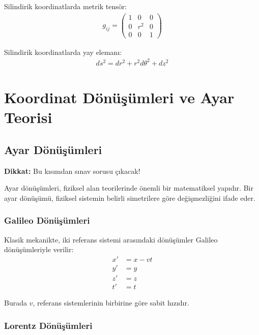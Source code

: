 \documentclass[11pt,letterpaper,twocolumn]{fenbil}
\begin{document}
Silindirik koordinatlarda metrik tensör:
\begin{align}
g_{ij} = \begin{pmatrix}
1 & 0 & 0 \\
0 & r^2 & 0 \\
0 & 0 & 1
\end{pmatrix}
\end{align}

Silindirik koordinatlarda yay elemanı:
\begin{align}
ds^2 = dr^2 + r^2d\theta^2 + dz^2
\end{align}

\maketitle

\section{Koordinat Dönüşümleri ve Ayar Teorisi}

\subsection{Ayar Dönüşümleri}

\textbf{Dikkat:} Bu kısımdan sınav sorusu çıkacak!

Ayar dönüşümleri, fiziksel alan teorilerinde önemli bir matematiksel yapıdır. Bir ayar dönüşümü, fiziksel sistemin belirli simetrilere göre değişmezliğini ifade eder. 

\subsubsection{Galileo Dönüşümleri}

Klasik mekanikte, iki referans sistemi arasındaki dönüşümler Galileo dönüşümleriyle verilir:
\begin{align}
x' &= x - vt \\
y' &= y \\
z' &= z \\
t' &= t
\end{align}

Burada $v$, referans sistemlerinin birbirine göre sabit hızıdır.

\subsubsection{Lorentz Dönüşümleri}
\end{document}
